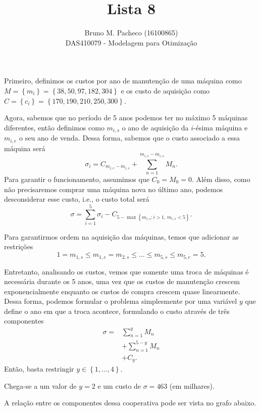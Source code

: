 \documentclass[a4paper]{report}
\begin{document}
 
\title{Lista 8}
\author{Bruno M. Pacheco (16100865)\\
DAS410079 - Modelagem para Otimização}
 
\maketitle
 

Primeiro, definimos os custos por ano de manutenção de uma máquina como $M = \left\{ m_i \right\} = \left\{ 38, 50, 97, 182, 304 \right\} $ e os custo de aquisição como $C = \left\{ c_i \right\} = \left\{ 170, 190, 210, 250, 300 \right\} $.

Agora, sabemos que no período de 5 anos podemos ter no máximo 5 máquinas diferentes, então definimos como $m_{i,s}$ o ano de aquisição da $i$-ésima máquina e $m_{i,e}$ o seu ano de venda. Dessa forma, sabemos que o custo associado a essa máquina será \[
\sigma_i = C_{m_{i,e} - m_{i,s}} + \sum_{n=1}^{m_{i,e} - m_{i,s}} M_n
.\] Para garantir o funcionamento, assumimos que $C_0 = M_0 = 0$. Além disso, como não precisaremos comprar uma máquina nova no último ano, podemos desconsiderar esse custo, i.e., o custo total será \[
\sigma = \sum_{i=1}^{5} \sigma_i - C_{5-\max\left\{  m_{i,s}: i>1 ,\, m_{i,s} < 5\right\} }
.\] 

Para garantirmos ordem na aquisição das máquinas, temos que adicionar as restrições \[
1 = m_{1,s} \le m_{1,e} = m_{2,s} \le \ldots \le m_{5,s} \le m_{5,e} = 5
.\] 

Entretanto, analisando os custos, vemos que somente uma troca de máquinas é necessária durante os 5 anos, uma vez que os custos de manutenção crescem exponencialmente enquanto os custos de compra crescem quase linearmente. Dessa forma, podemos formular o problema simplesmente por uma variável $y$ que define o ano em que a troca acontece, formulando o custo através de três componentes
\begin{align*}
    \sigma = & \sum_{n=1}^{y} M_n \\
	     &+ \sum_{n=1}^{5-y} M_n \\
	     &+ C_y
.\end{align*}
Então, basta restringir $y \in \left\{ 1,\ldots,4 \right\} $.

Chega-se a um valor de $y=2$ e um custo de $\sigma = 463$ (em milhares).


A relação entre os componentes dessa cooperativa pode ser vista no grafo abaixo.
\end{document}
